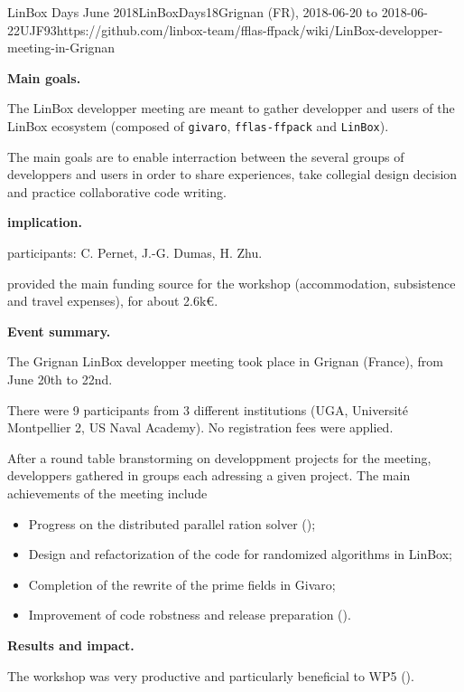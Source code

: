 \begin{event}{LinBox Days June 2018}{LinBoxDays18}{Grignan (FR),
2018-06-20 to 2018-06-22}{UJF}{9}{3}{https://github.com/linbox-team/fflas-ffpack/wiki/LinBox-developper-meeting-in-Grignan}

\textbf{Main goals.}

The LinBox developper meeting are meant to gather developper and users of the
LinBox ecosystem (composed of \texttt{givaro}, \texttt{fflas-ffpack} and
\texttt{LinBox}).

The main goals are to enable interraction between the several groups of
developpers and users in order to share experiences, take collegial design
decision and practice collaborative code writing.

\textbf{\ODK implication.}

\ODK participants: C. Pernet, J.-G. Dumas, H. Zhu.

\ODK provided the main funding source for the workshop (accommodation,
subsistence and travel expenses), for about 2.6k\euro.

\textbf{Event summary.}

The Grignan LinBox developper meeting took place in Grignan (France), from June
20th to 22nd.

There were 9 participants from 3 different institutions (UGA, Université
Montpellier 2, US Naval Academy).
No registration fees were applied.

After a round table branstorming on developpment projects for the meeting,
developpers gathered in groups each adressing a given project.
The main achievements of the meeting include
\begin{itemize}
\item Progress on the distributed parallel ration solver ();
\item Design and refactorization of the code for randomized algorithms in LinBox;
\item Completion of the rewrite of the prime fields in Givaro;
\item Improvement of code robstness and release preparation ().
\end{itemize}


\textbf{Results and impact.}

The workshop was very productive and particularly beneficial to WP5 ().
\end{event}
